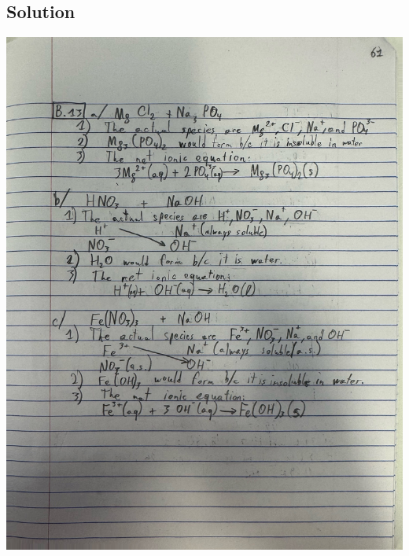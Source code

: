 \documentclass[10pt]{article}
\begin{document}
        \subsection{Solution}
            \begin{center}
                \includegraphics[width=\textwidth, trim={5in 27in 3in 6in},clip]{"Answers Images/IMG_6647.jpg"}


\end{center}
\end{document}
